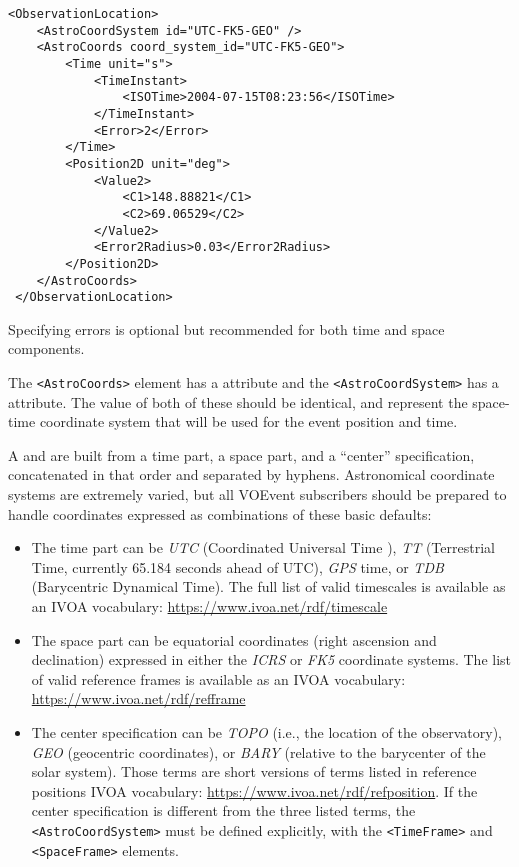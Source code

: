 \documentclass[11pt,a4paper]{ivoa}
\begin{document}
\begin{lstlisting}
<ObservationLocation>
    <AstroCoordSystem id="UTC-FK5-GEO" />
    <AstroCoords coord_system_id="UTC-FK5-GEO">
        <Time unit="s">
            <TimeInstant>
                <ISOTime>2004-07-15T08:23:56</ISOTime>
            </TimeInstant>
            <Error>2</Error>
        </Time>
        <Position2D unit="deg">
            <Value2>
                <C1>148.88821</C1>
                <C2>69.06529</C2>
            </Value2>
            <Error2Radius>0.03</Error2Radius>
        </Position2D>
    </AstroCoords>
 </ObservationLocation>
\end{lstlisting}

Specifying errors is optional but recommended for both time and space
components.

The \verb|<AstroCoords>| element has a  attribute and the
\verb|<AstroCoordSystem>| has a  attribute. The value of both of these
should be identical, and represent the space-time coordinate system that will be
used for the event position and time.

A  and  are built from a time part, a space part,
and a ``center'' specification, concatenated in that order and separated by
hyphens. Astronomical coordinate systems are extremely varied, but all VOEvent
subscribers should be prepared to handle coordinates expressed as combinations
of these basic defaults:
\begin{itemize}
\item The time part can be \emph{UTC} (Coordinated Universal Time
\citep{bib26}), \emph{TT} (Terrestrial Time, currently 65.184 seconds ahead of
UTC), \emph{GPS} time, or \emph{TDB} (Barycentric Dynamical Time). The full list
of valid timescales is available as an IVOA vocabulary:
\url{https://www.ivoa.net/rdf/timescale}
\item The space part can be equatorial coordinates (right ascension and
declination) expressed in either the \emph{ICRS} or \emph{FK5} coordinate
systems. The list of valid reference frames is available as an IVOA vocabulary:
\url{https://www.ivoa.net/rdf/refframe}
\item The center specification can be \emph{TOPO} (i.e., the location of the
observatory), \emph{GEO} (geocentric coordinates), or \emph{BARY} (relative to
the barycenter of the solar system). Those terms are short versions of terms
listed in reference positions IVOA vocabulary: \url{https://www.ivoa.net/rdf/refposition}.
If the center specification is different from the three listed terms, the
\verb|<AstroCoordSystem>| must be defined explicitly, with the \verb|<TimeFrame>|
and \verb|<SpaceFrame>| elements.
\end{itemize}
\end{document}
